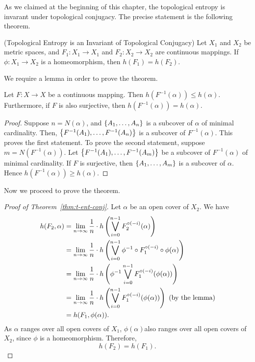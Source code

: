 \documentclass[12pt,twoside,draft]{book}
\begin{document}
As we claimed at the beginning of this chapter, the topological entropy is invarant under topological conjugacy.
The precise statement is the following theorem.
\begin{theorem}
  (Topological Entropy is an Invariant of Topological Conjugacy)
  Let $X_1$ and $X_2$ be metric spaces, and $F_1: X_1 \to X_1$ and $F_2: X_2 \to X_2$ are continuous mappings.
  If $\phi: X_1 \to X_2$ is a homeomorphism, then $h(F_1) = h(F_2)$.
  \label{thm:t-ent-conj}
\end{theorem}
We require a lemma in order to prove the theorem.

\begin{lemma}
  Let $F: X\to X$ be a continuous mapping.
  Then $h(F^{-1}(\alpha)) \leq h(\alpha)$.
  Furthermore, if $F$ is also surjective, then $h(F^{-1}(\alpha)) = h(\alpha)$.
  \begin{proof}
    Suppose $n = N(\alpha)$, and $\left \{ A_1, \ldots, A_{n} \right \}$ is a subcover of $\alpha$ of minimal cardinality.
    Then, $\left \{ F^{-1}(A_1), \ldots, F^{-1}(A_{n}) \right \}$ is a subcover of $F^{-1}(\alpha)$.
    This proves the first statement.
    To prove the second statement, suppose $m = N(F^{-1}(\alpha))$.
    Let $\left \{ F^{-1}(A_1), \ldots, F^{-1}(A_{m}) \right \}$ be a subcover of $F^{-1}(\alpha)$ of minimal cardinality.
    If $F$ is surjective, then $\left \{ A_1, \ldots, A_{m} \right \}$ is a subcover of $\alpha$.
  Hence $h(F^{-1}(\alpha)) \geq h(\alpha)$.
  \end{proof}
  
\end{lemma}

Now we proceed to prove the theorem.
\begin{proof}[Proof of Theorem~\ref{thm:t-ent-conj}]
  Let $\alpha$ be an open cover of $X_2$.
  We have
  \begin{align*}
    h(F_2, \alpha)
    &= \lim\limits_{n \to \infty} \frac{1}{n} \cdot h \left ( \bigvee\limits_{i = 0}^{n-1} F_2^{\circ (-i)}(\alpha) \right ) \\
    &= \lim\limits_{n \to \infty} \frac{1}{n} \cdot h \left ( \bigvee\limits_{i = 0}^{n-1} \phi^{-1} \circ F_1^{\circ (-i)} \circ \phi (\alpha) \right ) \\
    &= \lim\limits_{n \to \infty} \frac{1}{n} \cdot h \left ( \phi^{-1} \bigvee\limits_{i = 0}^{n-1} F_1^{\circ (-i)} (\phi (\alpha)) \right ) \\
    &= \lim\limits_{n \to \infty} \frac{1}{n} \cdot h \left ( \bigvee\limits_{i = 0}^{n-1} F_1^{\circ (-i)} (\phi (\alpha)) \right ) \mbox{ (by the lemma)} \\
    &= h(F_1, \phi(\alpha)).
  \end{align*}
  As $\alpha$ ranges over all open covers of $X_1$, $\phi(\alpha)$also ranges over all open covers of $X_2$, since $\phi$ is a homeomorphism.
  Therefore,
  \begin{equation*}
    h(F_2) = h(F_1).
  \end{equation*}
\end{proof}
\end{document}
